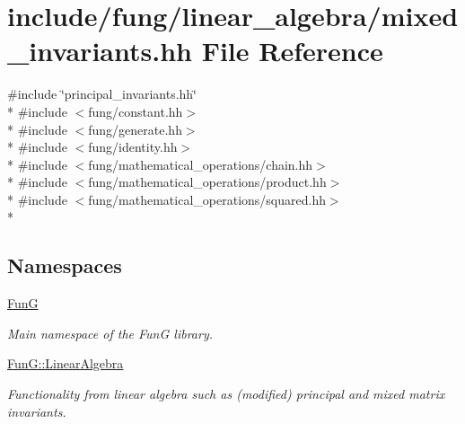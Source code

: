 \hypertarget{mixed__invariants_8hh}{}\section{include/fung/linear\+\_\+algebra/mixed\+\_\+invariants.hh File Reference}
\label{mixed__invariants_8hh}
{\ttfamily \#include \char`\"{}principal\+\_\+invariants.\+hh\char`\"{}}\\*
{\ttfamily \#include $<$fung/constant.\+hh$>$}\\*
{\ttfamily \#include $<$fung/generate.\+hh$>$}\\*
{\ttfamily \#include $<$fung/identity.\+hh$>$}\\*
{\ttfamily \#include $<$fung/mathematical\+\_\+operations/chain.\+hh$>$}\\*
{\ttfamily \#include $<$fung/mathematical\+\_\+operations/product.\+hh$>$}\\*
{\ttfamily \#include $<$fung/mathematical\+\_\+operations/squared.\+hh$>$}\\*
\subsection*{Namespaces}
\begin{DoxyCompactItemize}
\item 
 \hyperlink{namespaceFunG}{FunG}
\begin{DoxyCompactList}\small\item\em Main namespace of the FunG library. \end{DoxyCompactList}\item 
 \hyperlink{namespaceFunG_1_1LinearAlgebra}{Fun\+G\+::\+Linear\+Algebra}
\begin{DoxyCompactList}\small\item\em Functionality from linear algebra such as (modified) principal and mixed matrix invariants. \end{DoxyCompactList}\end{DoxyCompactItemize}
